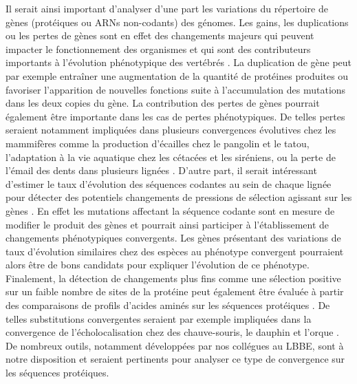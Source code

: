 Il serait ainsi important d'analyser d'une part les variations du répertoire de gènes (protéiques ou ARNs non-codants) des génomes. Les gains, les duplications ou les pertes de gènes sont en effet des changements majeurs qui peuvent impacter le fonctionnement des organismes et qui sont des contributeurs importants à l’évolution phénotypique des vertébrés \citep{kaessmann_origins_2010, chen_new_2013, albalat_evolution_2016}. La duplication de gène peut par exemple entraîner une augmentation de la quantité de protéines produites ou favoriser l’apparition de nouvelles fonctions suite à l’accumulation des mutations dans les deux copies du gène. La contribution des pertes de gènes pourrait également être importante dans les cas de pertes phénotypiques. De telles pertes seraient notamment impliquées dans plusieurs convergences évolutives chez les mammifères comme la production d’écailles chez le pangolin et le tatou, l’adaptation à la vie aquatique chez les cétacées et les siréniens, ou la perte de l’émail des dents dans plusieurs lignées \citep{sharma_genomics_2018, huelsmann_genes_2019}. D'autre part, il serait intéressant d'estimer le taux d’évolution des séquences codantes au sein de chaque lignée pour détecter des potentiels changements de pressions de sélection agissant sur les gènes \citep{nei_simple_1986}. En effet les mutations affectant la séquence codante sont en mesure de modifier le produit des gènes et pourrait ainsi participer à l’établissement de changements phénotypiques convergents. Les gènes présentant des variations de taux d’évolution similaires chez des espèces au phénotype convergent pourraient alors être de bons candidats pour expliquer l’évolution de ce phénotype. Finalement, la détection de changements plus fins comme une sélection positive sur un faible nombre de sites de la protéine peut également être évaluée à partir des comparaisons de profils d’acides aminés sur les séquences protéiques \citep{rey_detecting_2019}. De telles substitutions convergentes seraient par exemple impliquées dans la convergence de l’écholocalisation chez des chauve-souris, le dauphin et l’orque \citep{marcovitz_functional_2019}. De nombreux outils, notamment développées par nos collégues au LBBE, sont à notre disposition et seraient pertinents pour analyser ce type de convergence sur les séquences protéiques. \\
